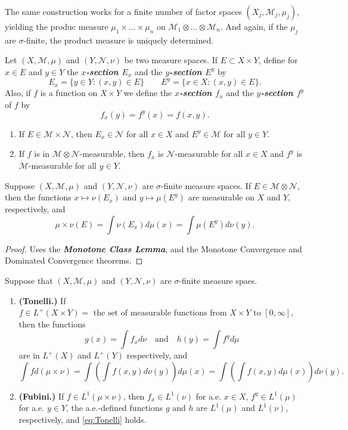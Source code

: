 \documentclass{article}
\theoremstyle{definition}
\numberwithin{equation}{section}
\begin{document}
	The same construction works for a finite number of factor spaces $(X_j,\mathcal{M}_j,\mu_j)$, yielding the produc measure $\mu_1\times\ldots\times\mu_n$ on $\mathcal{M}_1\otimes\ldots\otimes\mathcal{M}_n$. And again, if the $\mu_j$ are $\sigma$-finite, the product measure is uniquely determined.
	
	Let $(X,\mathcal{M},\mu)$ and $(Y,\mathcal{N},\nu)$ be two measure spaces. If $E\subset X\times Y$, define for $x\in E$ and $y\in Y$ the \textbf{\textit{$x$-section $E_x$}} and the \textbf{\textit{$y$-section $E^y$}} by
	\[E_x=\{y\in Y:(x,y)\in E\}\qquad E^y=\{x\in X:(x,y)\in E\}.\]
	Also, if $f$ is a function on $X\times Y$ we define the \textbf{\textit{$x$-section $f_x$}} and the \textbf{\textit{$y$-section $f^y$}} of $f$ by
	\[f_x(y)=f^y(x)=f(x,y).\]
	\begin{prop}\leavevmode
		\begin{enumerate}
			\item If $E\in \mathcal{M}\times\mathcal{N}$, then $E_x\in \mathcal{N}$ for all $x\in X$ and $E^y\in\mathcal{M}$ for all $y\in Y$.
			\item If $f$ is in $\mathcal{M}\otimes\mathcal{N}$-measurable, then $f_x$ is $\mathcal{N}$-measurable for all $x\in X$ and $f^y$ is $\mathcal{M}$-measurable for all $y\in Y$.
		\end{enumerate}
	\end{prop}
	\begin{thm}\label{thm:Fubini-Tonelli-previous}
		Suppose $(X,\mathcal{M},\mu)$ and $(Y,\mathcal{N},\nu)$ are $\sigma$-finite measure spaces. If $E\in\mathcal{M}\otimes\mathcal{N}$, then the functions $x\mapsto\nu(E_x)$ and $y\mapsto\mu(E^y)$ are measurable on $X$ and $Y$, respectively, and
		\[\mu\times\nu(E)=\int\nu(E_x)d\mu(x)=\int\mu(E^y)d\nu(y).\]
	\end{thm}
	\begin{proof}
		Uses the \textbf{\textit{Monotone Class Lemma}}, and the Monotone Convergence and Dominated Convergence theorems.
	\end{proof}
	\begin{thm} Suppose that $(X,\mathcal{M},\mu)$ and $(Y,\mathcal{N},\nu)$ are $\sigma$-finite measure spaes.
	\begin{enumerate}
		\item \textbf{(Tonelli.)} If $f\in L^+(X\times Y)=\text{ the set of measurable functions from }X\times Y\text{ to }[0,\infty]$, then the functions
			\[g(x)=\int f_xd\nu\quad\text{and}\quad h(y)=\int f^yd\mu\]
		are in $L^+(X)$ and $L^+(Y)$ respectively, and
		\begin{equation}\label{eq:Tonelli}
			\int fd(\mu\times\nu)=\int\left(\int f(x,y)d\nu(y)\right)d\mu(x)=\int\left(\int f(x,y)d\mu(x)\right)d\nu(y).
		\end{equation}
		\item \textbf{(Fubini.)} If $f\in L^1(\mu\times\nu)$, then $f_x\in L^1(\nu)$ for a.e. $x\in X$, $f^y\in L^1(\mu)$ for a.e. $y\in Y$, the a.e.-defined functions $g$ and $h$ are $L^1(\mu)$ and $L^1(\nu)$, respectively, and \cref{eq:Tonelli} holds.
	\end{enumerate}
	\end{thm}
\end{document}
